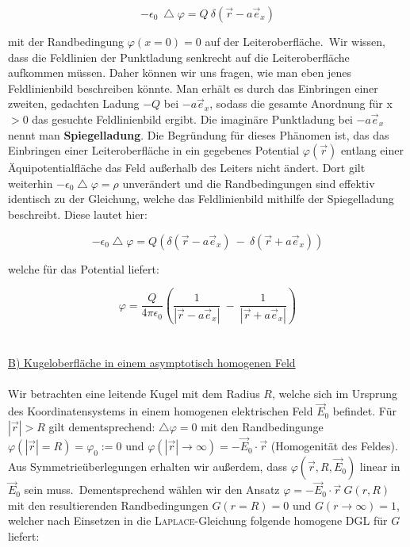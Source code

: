 \begin{equation*}
-\epsilon_0 \ \bigtriangleup\varphi = Q \ \delta(\vec{r}-a\vec{e}_x)
\end{equation*}

mit der Randbedingung $\varphi(x=0) = 0$ auf der Leiteroberfläche.\
Wir wissen, dass die Feldlinien der Punktladung senkrecht auf die Leiteroberfläche aufkommen müssen. Daher können wir uns fragen, wie man eben jenes Feldlinienbild beschreiben könnte. Man erhält es durch das Einbringen einer zweiten, gedachten Ladung $-Q$ bei $-a\vec{e}_x$, sodass die gesamte Anordnung für x$>0$ das gesuchte Feldlinienbild ergibt. Die imaginäre Punktladung bei $-a\vec{e}_x$ nennt man \textbf{Spiegelladung}. Die Begründung für dieses Phänomen ist, das das Einbringen einer Leiteroberfläche in ein gegebenes Potential $\varphi (\vec{r})$ entlang einer Äquipotentialfläche das Feld außerhalb des Leiters nicht ändert. Dort gilt weiterhin $-\epsilon_0 \bigtriangleup\varphi = \rho$ unverändert und die Randbedingungen sind effektiv identisch zu der Gleichung, welche das Feldlinienbild mithilfe der Spiegelladung beschreibt. Diese lautet hier:

\begin{equation*}
- \epsilon_0\bigtriangleup\varphi = Q \left(\delta(\vec{r}-a\vec{e}_x) \ - \ \delta(\vec{r}+a\vec{e}_x)\right)
\end{equation*}

welche für das Potential liefert:

\begin{equation*}
\varphi = \frac{Q}{4\pi\epsilon_0} \left(\frac{1}{|\vec{r}-a\vec{e}_x|} \ - \ \frac{1}{|\vec{r}+a\vec{e}_x|}\right)
\end{equation*}
\ \\
\ \\

\underline{B) Kugeloberfläche in einem asymptotisch homogenen Feld}\
\\
\ \\
Wir betrachten eine leitende Kugel mit dem Radius $R$, welche sich im Ursprung des Koordinatensystems in einem homogenen elektrischen Feld $\vec{E}_0$ befindet. Für $|\vec{r}|>R$ gilt dementsprechend: $\bigtriangleup\varphi = 0$ mit den Randbedingunge $\varphi(|\vec{r}| = R) = \varphi_0 := 0$ und $\varphi(|\vec{r}|\rightarrow\infty) = -\vec{E}_0\cdot\vec{r}$ (Homogenität des Feldes). Aus Symmetrieüberlegungen erhalten wir außerdem, dass $\varphi(\vec{r},R,\vec{E}_0)$ linear in $\vec{E}_0$ sein muss.\
Dementsprechend wählen wir den Ansatz $\varphi = -\vec{E}_0 \cdot\vec{r} \ G(r,R)$ mit den resultierenden Randbedingungen $G(r=R)=0$ und $G(r\rightarrow\infty
) =1$, welcher nach Einsetzen in die \textsc{Laplace}-Gleichung folgende homogene DGL für $G$ liefert:

